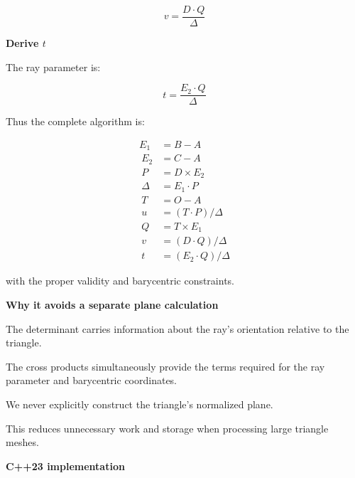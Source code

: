\[
\boxed{ v=\frac{D\cdot Q}{\Delta} }
\]

\textbf{Derive \(t\)}

The ray parameter is:

\[
\boxed{ t=\frac{E_2\cdot Q}{\Delta} }
\]

Thus the complete algorithm is:

\[
\begin{aligned} E_1&=B-A\\\ E_2&=C-A\\\ P&=D\times E_2\\\ \Delta&=E_1\cdot P\\\ T&=O-A\\\ u&=(T\cdot P)/\Delta\\\ Q&=T\times E_1\\\ v&=(D\cdot Q)/\Delta\\\ t&=(E_2\cdot Q)/\Delta \end{aligned}
\]

with the proper validity and barycentric constraints.

\textbf{Why it avoids a separate plane calculation}

The determinant carries information about the ray's orientation relative to the triangle.

The cross products simultaneously provide the terms required for the ray parameter and barycentric coordinates.

We never explicitly construct the triangle's normalized plane.

This reduces unnecessary work and storage when processing large triangle meshes.

\textbf{C++23 implementation}

